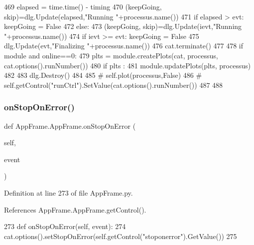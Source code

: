 \begin{DoxyCode}
469                 elapsed = time.time() - timing
470                 (keepGoing, skip)=dlg.Update(elapsed,\textcolor{stringliteral}{"Running "}+processus.name())
471                 \textcolor{keywordflow}{if} elapsed > evt: keepGoing = \textcolor{keyword}{False}
472             \textcolor{keywordflow}{else}:
473                 (keepGoing, skip)=dlg.Update(ievt,\textcolor{stringliteral}{"Running "}+processus.name())
474                 \textcolor{keywordflow}{if} ievt >= evt: keepGoing = \textcolor{keyword}{False}
475         dlg.Update(evt,\textcolor{stringliteral}{"Finalizing "}+processus.name())
476         cat.terminate()
477 
478         \textcolor{keywordflow}{if} module \textcolor{keywordflow}{and} online==0:
479             plts = module.createPlots(cat, processus, cat.options().runNumber())        
480             \textcolor{keywordflow}{if} plts :
481                 module.updatePlots(plts, processus)
482         
483         dlg.Destroy()
484         
485 \textcolor{comment}{#        self.plot(processus,False)}
486 \textcolor{comment}{#        self.getControl("runCtrl").SetValue(cat.options().runNumber())}
487                 
488         
\end{DoxyCode}
\mbox{\label{classAppFrame_1_1AppFrame_ab6fb8d94be671fbbad0a873282e75830}} 
\subsubsection{\texorpdfstring{on\+Stop\+On\+Error()}{onStopOnError()}}
{\footnotesize\ttfamily def App\+Frame.\+App\+Frame.\+on\+Stop\+On\+Error (\begin{DoxyParamCaption}\item[{}]{self,  }\item[{}]{event }\end{DoxyParamCaption})}



Definition at line 273 of file App\+Frame.\+py.



References App\+Frame.\+App\+Frame.\+get\+Control().


\begin{DoxyCode}
273     \textcolor{keyword}{def }onStopOnError(self, event):
274         cat.options().setStopOnError(self.getControl(\textcolor{stringliteral}{"stoponerror"}).GetValue())
275 
\end{DoxyCode}
\mbox{\label{classAppFrame_1_1AppFrame_a447c97fade589311c9e60e66c1ce795c}} 
